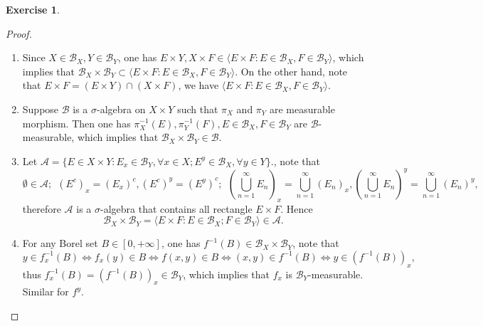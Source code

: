 \documentclass[a4paper]{article}
\newtheorem{ex}{Exercise}[subsection]
\begin{document}
\setcounter{ex}{17}\begin{ex}\end{ex}\begin{proof}\ 
\begin{enumerate}[label = (\roman*)]
    \item Since $X \in \mathcal{B}_X, Y \in \mathcal{B}_Y$, one has $E \times Y, X \times F \in \langle E \times F : E 
    \in \mathcal{B}_X, F \in \mathcal{B}_Y \rangle$, which implies that $\mathcal{B}_X \times \mathcal{B}_Y \subset \langle E \times F : E 
    \in \mathcal{B}_X, F \in \mathcal{B}_Y \rangle$. On the other hand, note that $E \times F = (E \times Y) \cap (X \times F)$,
    we have $\langle E \times F : E \in \mathcal{B}_X, F \in \mathcal{B}_Y \rangle$. 
    \item Suppose $\mathcal{B}$ is a $\sigma$-algebra on $X \times Y$ such that $\pi_X$ and $\pi_Y$ are measurable 
    morphism. Then one has $\pi_X^{-1}(E), \pi_Y^{-1}(F), E \in \mathcal{B}_X, F \in \mathcal{B}_Y$ are $\mathcal{B}$-
    measurable, which implies that $\mathcal{B}_X \times \mathcal{B}_Y \in \mathcal{B}$.
    \item Let $
    \mathcal{A} = \{E \in X \times Y : E_x \in \mathcal{B}_Y, \forall x \in X; E^y \in \mathcal{B}_X, \forall y \in Y\}.
    $, note that $$
    \emptyset \in \mathcal{A};\ \ (E^c)_x = (E_x)^c, (E^c)^y = (E^y)^c;\ \ (\bigcup_{n = 1}^\infty E_n)_x = \bigcup_{n = 1}^\infty (E_n)_x,
    (\bigcup_{n = 1}^\infty E_n)^y = \bigcup_{n = 1}^\infty (E_n)^y,
    $$therefore $\mathcal{A}$ is a $\sigma$-algebra that contains all rectangle $E \times F$. Hence $$
    \mathcal{B}_X \times \mathcal{B}_Y = \langle E \times F : E \in \mathcal{B}_X; F \in \mathcal{B}_Y\rangle \in \mathcal{A}.
    $$
    \item For any Borel set $B \in [0, +\infty]$, one has $f^{-1}(B) \in \mathcal{B}_X \times \mathcal{B}_Y$, note that$$
    y \in f_x^{-1}(B) \iff f_x(y) \in B \iff f(x, y) \in B \iff (x, y) \in f^{-1}(B) \iff y \in (f^{-1}(B))_x,
    $$thus $f_x^{-1}(B) = (f^{-1}(B))_x \in \mathcal{B}_Y$, which implies that $f_x$ is $\mathcal{B}_Y$-measurable.
    Similar for $f^y$.
    
\end{enumerate}
\end{proof}
\end{document}
